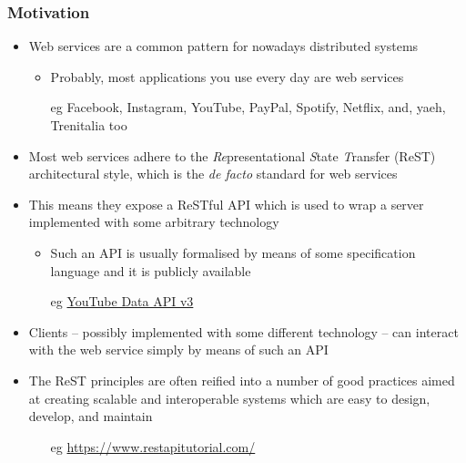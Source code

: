 \documentclass[presentation]{beamer}\mode<presentation>{\usetheme{AMSBolognaFC}}
\begin{document}
\begin{frame}[allowframebreaks]
\frametitle{Motivation}

\begin{itemize}
    \item \alert{Web services} are a common pattern for nowadays distributed systems
    \begin{itemize}
        \item Probably, most applications you use every day are web services
        \item[eg] Facebook, Instagram, YouTube, PayPal, Spotify, Netflix, and, yaeh, \alert{Trenitalia} too
    \end{itemize}

    \vspace{.3cm}

    \item Most web services adhere to the \alert{\emph{Re}presentational \emph{S}tate \emph{T}ransfer} (ReST) architectural style, which is the \emph{de facto} standard for web services

    \vspace{.3cm}

    \item This means they expose a \alert{ReSTful API} which is used to wrap a server implemented with some arbitrary technology
    \begin{itemize}
        \item Such an API is usually formalised by means of some \alert{specification language} and it is publicly available

        \item[eg] \href{https://developers.google.com/apis-explorer/\#p/youtube/v3}{YouTube Data API v3}
    \end{itemize}

    \framebreak

    \item Clients -- possibly implemented with some different technology -- can interact with the web service simply by means of such an API

    \vspace{.3cm}

    \item The ReST principles are often reified into a number of good practices aimed at creating \alert{scalable} and \alert{interoperable} systems which are easy to design, develop, and maintain
    \begin{itemize}
        \item[eg] \url{https://www.restapitutorial.com/}
    \end{itemize}
\end{itemize}
\end{frame}
\end{document}
